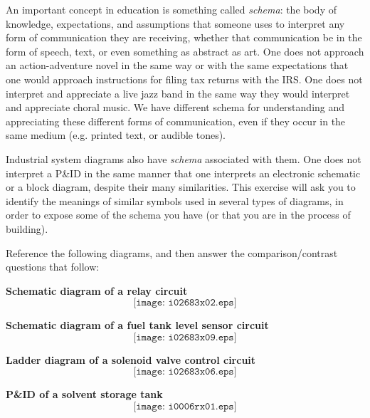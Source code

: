 

An important concept in education is something called {\it schema}: the body of knowledge, expectations, and assumptions that someone uses to interpret any form of communication they are receiving, whether that communication be in the form of speech, text, or even something as abstract as art.  One does not approach an action-adventure novel in the same way or with the same expectations that one would approach instructions for filing tax returns with the IRS.  One does not interpret and appreciate a live jazz band in the same way they would interpret and appreciate choral music.  We have different schema for understanding and appreciating these different forms of communication, even if they occur in the same medium (e.g. printed text, or audible tones).

\vskip 10pt

Industrial system diagrams also have {\it schema} associated with them.  One does not interpret a P\&ID in the same manner that one interprets an electronic schematic or a block diagram, despite their many similarities.  This exercise will ask you to identify the meanings of similar symbols used in several types of diagrams, in order to expose some of the schema you have (or that you are in the process of building).

\vskip 10pt

Reference the following diagrams, and then answer the comparison/contrast questions that follow:

\vskip 10pt

\filbreak

\noindent
{\bf Schematic diagram of a relay circuit}
$$\texttt{[image: i02683x02.eps]}$$

\filbreak

\noindent
{\bf Schematic diagram of a fuel tank level sensor circuit}
$$\texttt{[image: i02683x09.eps]}$$


\filbreak

\noindent
{\bf Ladder diagram of a solenoid valve control circuit}
$$\texttt{[image: i02683x06.eps]}$$

\filbreak

\noindent
{\bf P\&ID of a solvent storage tank}
$$\texttt{[image: i0006rx01.eps]}$$

